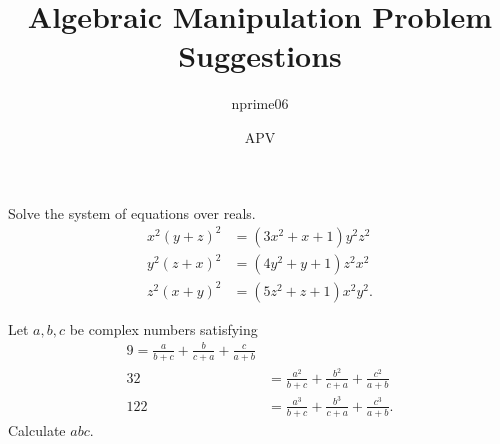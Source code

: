 \documentclass[mast]{lucky}
\title{Algebraic Manipulation Problem Suggestions}
\author{nprime06}
\date{APV}
\begin{document}
\maketitle

\begin{prob}{}
Solve the system of equations over reals. 
\begin{align*}
x^2(y+z)^2&=(3x^2+x+1)y^2z^2\\
y^2(z+x)^2&=(4y^2+y+1)z^2x^2\\
z^2(x+y)^2&=(5z^2+z+1)x^2y^2.
\end{align*}
\end{prob}

\begin{prob}[CMIMC 2017]{}
Let $a,b,c$ be complex numbers satisfying 
\begin{align*}
9=\frac a{b+c}+\frac b{c+a}+\frac c{a+b}\\ 
32 &= \frac{a^2}{b+c}+\frac{b^2}{c+a}+\frac{c^2}{a+b}\\ 
122&= \frac{ a^3}{b+c}+\frac{b^3}{c+a}+\frac{c^3}{a+b}.
\end{align*}
Calculate $abc$. 
\end{prob}
\end{document}
